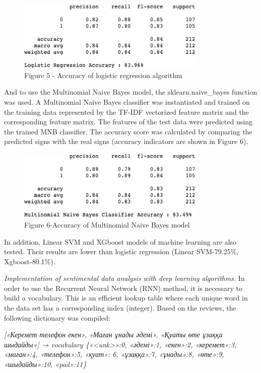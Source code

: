 \begin{figure}[H]
	\centering
	\includegraphics[width=0.8\textwidth]{media/ict/image12}
	\caption*{Figure 5 - Accuracy of logistic regression algorithm}
\end{figure}

And to use the Multinomial Naive Bayes model, the sklearn.naive\_bayes
function was used. A Multinomial Naive Bayes classifier was instantiated
and trained on the training data represented by the TF-IDF vectorized
feature matrix and the corresponding feature matrix. The features of the
test data were predicted using the trained MNB classifier. The accuracy
score was calculated by comparing the predicted signs with the real
signs (accuracy indicators are shown in Figure 6).

\begin{figure}[H]
	\centering
	\includegraphics[width=0.8\textwidth]{media/ict/image13}
	\caption*{Figure 6-Accuracy of Multinomial Naive Bayes model}
\end{figure}

In addition, Linear SVM and XGboost models of machine learning are also
tested. Their results are lower than logistic regression (Linear
SVM-79.25\%, Xgboost-80.1\%).

\emph{Implementation of sentimental data analysis with deep learning
algorithms.} In order to use the Recurrent Neural Network (RNN) method,
it is necessary to build a vocabulary. This is an efficient lookup table
where each unique word in the data set has a corresponding index
(integer). Based on the reviews, the following dictionary was compiled:

\emph{{[}«Керемет телефон екен», «Маған ұнады әдемі», «Қуаты өте ұзаққа
шыдайды»{]} → vocabulary \{«\textless unk\textgreater»:0, «әдемі»:1,
«екен»:2, «керемет»:3, «маған»:4, «телефон»:5, «қуат»: 6, «ұзаққа»:7,
«ұнады»:8, «өте»:9, «шыдайды»:10, «pad»:11\}}

